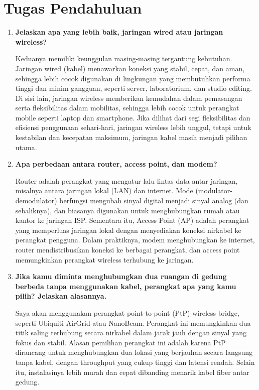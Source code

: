  \section{Tugas Pendahuluan}
\begin{enumerate}
    \item \textbf{Jelaskan apa yang lebih baik, jaringan wired atau jaringan wireless?}

    Keduanya memiliki keunggulan masing-masing tergantung kebutuhan. Jaringan wired (kabel) menawarkan koneksi yang stabil, cepat, dan aman, sehingga lebih cocok digunakan di lingkungan yang membutuhkan performa tinggi dan minim gangguan, seperti server, laboratorium, dan studio editing. Di sisi lain, jaringan wireless memberikan kemudahan dalam pemasangan serta fleksibilitas dalam mobilitas, sehingga lebih cocok untuk perangkat mobile seperti laptop dan smartphone. Jika dilihat dari segi fleksibilitas dan efisiensi penggunaan sehari-hari, jaringan wireless lebih unggul, tetapi untuk kestabilan dan kecepatan maksimum, jaringan kabel masih menjadi pilihan utama.

    \item \textbf{Apa perbedaan antara router, access point, dan modem?}

   {Router adalah perangkat yang mengatur lalu lintas data antar jaringan, misalnya antara jaringan lokal (LAN) dan internet. Mode} (modulator-demodulator) berfungsi mengubah sinyal digital menjadi sinyal analog (dan sebaliknya), dan biasanya digunakan untuk menghubungkan rumah atau kantor ke jaringan ISP. Sementara itu, Access Point (AP) adalah perangkat yang memperluas jaringan lokal dengan menyediakan koneksi nirkabel ke perangkat pengguna. Dalam praktiknya, modem menghubungkan ke internet, router mendistribusikan koneksi ke berbagai perangkat, dan access point memungkinkan perangkat wireless terhubung ke jaringan.

    \item \textbf{Jika kamu diminta menghubungkan dua ruangan di gedung berbeda tanpa menggunakan kabel, perangkat apa yang kamu pilih? Jelaskan alasannya.}

    Saya akan menggunakan perangkat point-to-point (PtP) wireless bridge, seperti Ubiquiti AirGrid atau NanoBeam. Perangkat ini memungkinkan dua titik saling terhubung secara nirkabel dalam jarak jauh dengan sinyal yang fokus dan stabil. Alasan pemilihan perangkat ini adalah karena PtP dirancang untuk menghubungkan dua lokasi yang berjauhan secara langsung tanpa kabel, dengan throughput yang cukup tinggi dan latensi rendah. Selain itu, instalasinya lebih murah dan cepat dibanding menarik kabel fiber antar gedung.
\end{enumerate}